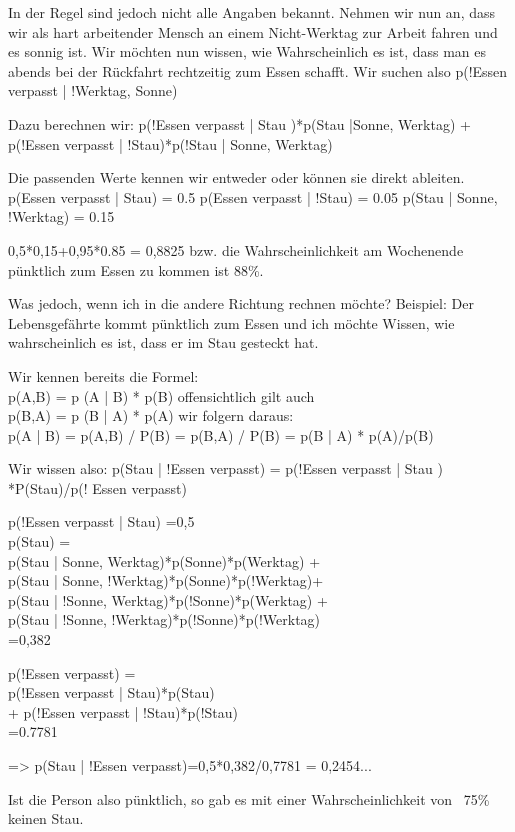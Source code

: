 In der Regel sind jedoch nicht alle Angaben bekannt.
Nehmen wir nun an, dass wir als hart arbeitender Mensch an einem Nicht-Werktag zur Arbeit fahren und es sonnig ist.
Wir möchten nun wissen, wie Wahrscheinlich es ist, dass man es abends bei der Rückfahrt rechtzeitig zum Essen schafft.
Wir suchen also p(!Essen verpasst | !Werktag, Sonne)

Dazu berechnen wir:
p(!Essen verpasst | Stau )*p(Stau |Sonne, Werktag) + p(!Essen verpasst | !Stau)*p(!Stau | Sonne, Werktag)

Die passenden Werte kennen wir entweder oder können sie direkt ableiten.
p(Essen verpasst | Stau) = 0.5
p(Essen verpasst | !Stau) = 0.05
p(Stau | Sonne, !Werktag) = 0.15

0,5*0,15+0,95*0.85 = 0,8825 bzw. die Wahrscheinlichkeit am Wochenende pünktlich zum Essen zu kommen ist 88\%.

Was jedoch, wenn ich in die andere Richtung rechnen möchte?
Beispiel: Der Lebensgefährte kommt pünktlich zum Essen und ich möchte Wissen, wie wahrscheinlich es ist, dass er im Stau gesteckt hat.

Wir kennen bereits die Formel:\\
p(A,B) = p (A | B) * p(B) offensichtlich gilt auch\\
p(B,A) = p (B | A) * p(A) wir folgern daraus:\\
p(A | B) = p(A,B) / P(B) = p(B,A) / P(B) = p(B | A) * p(A)/p(B)

Wir wissen also:
p(Stau | !Essen verpasst) = p(!Essen verpasst | Stau ) *P(Stau)/p(! Essen verpasst)

p(!Essen verpasst | Stau) =0,5\\
p(Stau) =\\
p(Stau | Sonne, Werktag)*p(Sonne)*p(Werktag) + \\ p(Stau | Sonne, !Werktag)*p(Sonne)*p(!Werktag)+ \\ p(Stau | !Sonne, Werktag)*p(!Sonne)*p(Werktag) + \\ p(Stau | !Sonne, !Werktag)*p(!Sonne)*p(!Werktag)\\ =0,382

p(!Essen verpasst) =\\
p(!Essen verpasst | Stau)*p(Stau)\\ + p(!Essen verpasst | !Stau)*p(!Stau)\\ =0.7781

=> p(Stau | !Essen verpasst)=0,5*0,382/0,7781 = 0,2454...

Ist die Person also pünktlich, so gab es mit einer Wahrscheinlichkeit von ~75\% keinen Stau.

